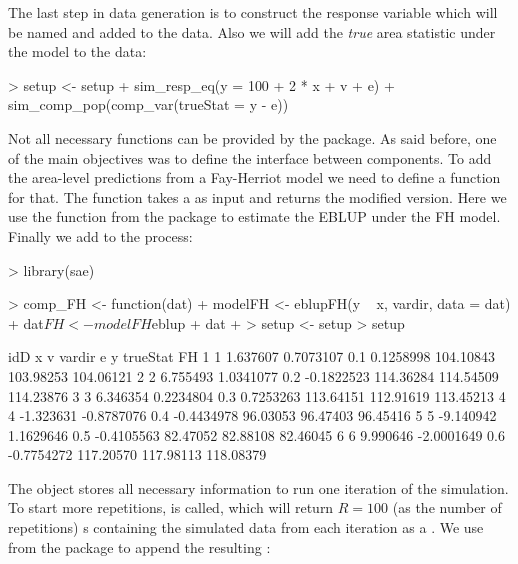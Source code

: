 \documentclass[article]{ajs}
\begin{document}
The last step in data generation is to construct the response variable which will be named  and added to the data. Also we will add the \textit{true} area statistic under the model to the data:

\begin{Schunk}
\begin{Sinput}
> setup <- setup %
+   sim_resp_eq(y = 100 + 2 * x + v + e) %
+   sim_comp_pop(comp_var(trueStat = y - e))
\end{Sinput}
\end{Schunk}

Not all necessary functions can be provided by the package. As said before, one of the main objectives was to define the interface between components. To add the area-level predictions from a Fay-Herriot model we need to define a function for that. The function takes a  as input and returns the modified version. Here we use the function  from the package  \citep{molina13} to estimate the EBLUP under the FH model. Finally we add  to the process:

\begin{Schunk}
\begin{Sinput}
> library(sae)
\end{Sinput}
\end{Schunk}
\begin{Schunk}
\begin{Sinput}
> comp_FH <- function(dat) {
+   modelFH <- eblupFH(y ~ x, vardir, data = dat)
+   dat$FH <- modelFH$eblup
+   dat
+ }
> setup <- setup %
> setup
\end{Sinput}
\begin{Soutput}
  idD         x          v vardir          e         y  trueStat        FH
1   1  1.637607  0.7073107    0.1  0.1258998 104.10843 103.98253 104.06121
2   2  6.755493  1.0341077    0.2 -0.1822523 114.36284 114.54509 114.23876
3   3  6.346354  0.2234804    0.3  0.7253263 113.64151 112.91619 113.45213
4   4 -1.323631 -0.8787076    0.4 -0.4434978  96.03053  96.47403  96.45416
5   5 -9.140942  1.1629646    0.5 -0.4105563  82.47052  82.88108  82.46045
6   6  9.990646 -2.0001649    0.6 -0.7754272 117.20570 117.98113 118.08379
\end{Soutput}
\end{Schunk}

The object  stores all necessary information to run one iteration of the simulation. To start more repetitions,  is called, which will return $R = 100$ (as the number of repetitions) s containing the simulated data from each iteration as a . We use  from the package  to append the resulting :
\end{document}
